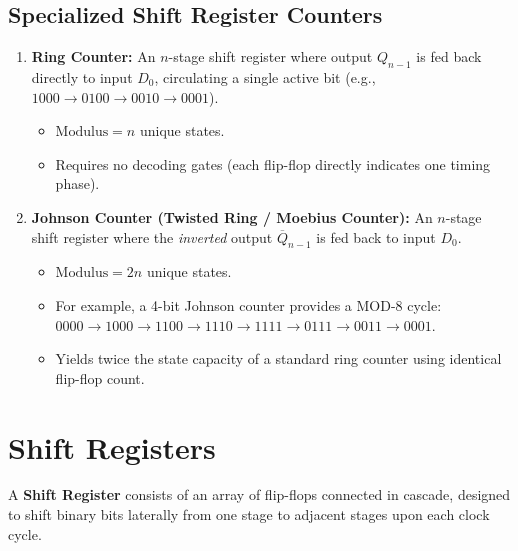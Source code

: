 \subsection{Specialized Shift Register Counters}
\begin{enumerate}[label=\bfseries\arabic*.]
    \item \textbf{Ring Counter:} An $n$-stage shift register where output $Q_{n-1}$ is fed back directly to input $D_0$, circulating a single active bit (e.g., $1000 \to 0100 \to 0010 \to 0001$).
    \begin{itemize}
        \item $\text{Modulus} = n$ unique states.
        \item Requires no decoding gates (each flip-flop directly indicates one timing phase).
    \end{itemize}
    \item \textbf{Johnson Counter (Twisted Ring / Moebius Counter):} An $n$-stage shift register where the \textit{inverted} output $\overline{Q}_{n-1}$ is fed back to input $D_0$.
    \begin{itemize}
        \item $\text{Modulus} = 2n$ unique states.
        \item For example, a 4-bit Johnson counter provides a MOD-8 cycle: $0000 \to 1000 \to 1100 \to 1110 \to 1111 \to 0111 \to 0011 \to 0001$.
        \item Yields twice the state capacity of a standard ring counter using identical flip-flop count.
    \end{itemize}
\end{enumerate}


\section{Shift Registers}
\label{sec:shift_registers}

A \textbf{Shift Register} consists of an array of flip-flops connected in cascade, designed to shift binary bits laterally from one stage to adjacent stages upon each clock cycle.

